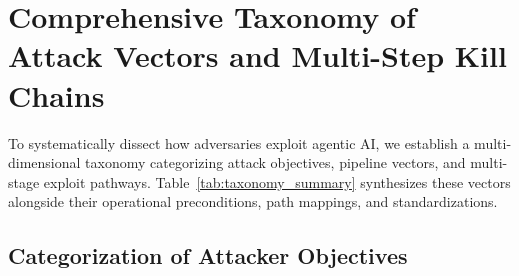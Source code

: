 \section{Comprehensive Taxonomy of Attack Vectors and Multi-Step Kill Chains}
\label{sec:attack_taxonomy}

To systematically dissect how adversaries exploit agentic AI, we establish a multi-dimensional taxonomy categorizing attack objectives, pipeline vectors, and multi-stage exploit pathways. Table~\ref{tab:taxonomy_summary} synthesizes these vectors alongside their operational preconditions, path mappings, and standardizations.



\subsection{Categorization of Attacker Objectives}
\label{subsec:goals}

